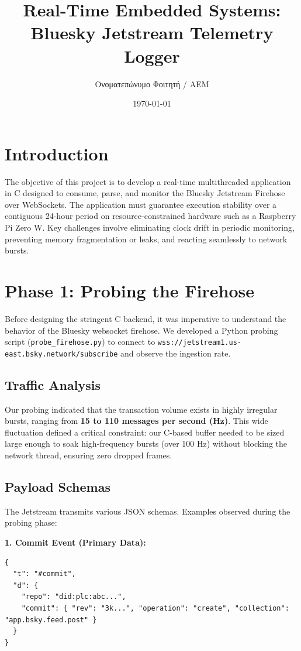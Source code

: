 \documentclass[12pt,a4paper]{article}
\title{Real-Time Embedded Systems: Bluesky Jetstream Telemetry Logger}
\author{\textgreek{Ονοματεπώνυμο Φοιτητή / AEM}}
\date{\today}
\begin{document}
\maketitle
\tableofcontents
\newpage

\section{Introduction}
The objective of this project is to develop a real-time multithreaded application in C designed to consume, parse, and monitor the Bluesky Jetstream Firehose over WebSockets. The application must guarantee execution stability over a contiguous 24-hour period on resource-constrained hardware such as a Raspberry Pi Zero W. Key challenges involve eliminating clock drift in periodic monitoring, preventing memory fragmentation or leaks, and reacting seamlessly to network bursts.

\section{Phase 1: Probing the Firehose}
Before designing the stringent C backend, it was imperative to understand the behavior of the Bluesky websocket firehose. We developed a Python probing script (\texttt{probe\_firehose.py}) to connect to \texttt{wss://jetstream1.us-east.bsky.network/subscribe} and observe the ingestion rate.

\subsection{Traffic Analysis}
Our probing indicated that the transaction volume exists in highly irregular bursts, ranging from \textbf{15 to 110 messages per second (Hz)}. This wide fluctuation defined a critical constraint: our C-based buffer needed to be sized large enough to soak high-frequency bursts (over 100 Hz) without blocking the network thread, ensuring zero dropped frames.

\subsection{Payload Schemas}
The Jetstream transmits various JSON schemas. Examples observed during the probing phase:

\textbf{1. Commit Event (Primary Data):}
\begin{verbatim}
{
  "t": "#commit",
  "d": {
    "repo": "did:plc:abc...",
    "commit": { "rev": "3k...", "operation": "create", "collection": "app.bsky.feed.post" }
  }
}
\end{verbatim}
\end{document}
